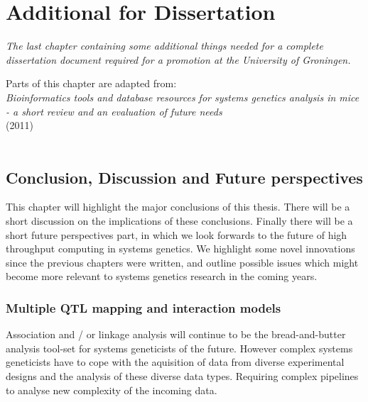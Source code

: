 \chapter{Additional for Dissertation}
\thispagestyle{empty}
\emph{The last chapter containing some additional things needed for a complete 
dissertation document required for a promotion at the University of Groningen.}
\null
\vfill

\begin{myexampleblock}{Parts of this chapter are adapted from:}
  \\
  \emph{ Bioinformatics tools and database resources for systems genetics analysis in mice 
         - a short review and an evaluation of future needs}\\
   (2011)\\\\
\end{myexampleblock}

\newpage

\section*{Conclusion, Discussion and Future perspectives}
This chapter will highlight the major conclusions of this thesis. There will be a short 
discussion on the implications of these conclusions.  Finally there will be a short future 
perspectives part, in which we look forwards to the future of high throughput computing in 
systems genetics. We highlight some novel innovations since the previous chapters were 
written, and outline possible issues which might become more relevant to systems genetics 
research in the coming years.

\subsection*{Multiple QTL mapping and interaction models}
Association and / or linkage analysis will continue to be the bread-and-butter analysis 
tool-set for systems geneticists of the future. However complex systems geneticists have 
to cope with the aquisition of data from diverse experimental designs and the analysis of 
these diverse data types. Requiring complex pipelines to analyse new complexity of the incoming data.

